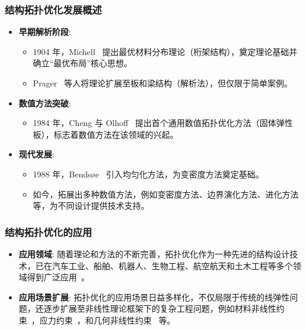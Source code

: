 \documentclass{beamer}  %
\numberwithin{subsection}{section}             %
\begin{document}
\begin{frame}
\frametitle{结构拓扑优化发展概述}
\small{
\begin{itemize}
	\item \textbf{早期解析阶段}:
	\begin{itemize}
		\item 1904 年，Michell~\cite{michell1904lviii} 提出最优材料分布理论（桁架结构），奠定理论基础并确立“最优布局”核心思想。
		
		\item Prager~\cite{prager1977optimization, rozvany1972optimal} 等人将理论扩展至板和梁结构（解析法），但仅限于简单案例。
	\end{itemize}
\end{itemize}

\begin{itemize}
	\item \textbf{数值方法突破}:
	\begin{itemize}
		\item 1984 年，Cheng 与 Olhoff~\cite{cheng1981investigation} 提出首个通用数值拓扑优化方法（固体弹性板），标志着数值方法在该领域的兴起。
	\end{itemize}
\end{itemize}

\begin{itemize}
	\item \textbf{现代发展}:
	\begin{itemize}
		\item 1988 年，Bendsøe~\cite{bendsoe1988generating} 引入均匀化方法，为变密度方法奠定基础。
		
		\item 如今，拓展出多种数值方法，例如变密度方法、边界演化方法、进化方法等，为不同设计提供技术支持。
	\end{itemize}
\end{itemize}
}
\end{frame}

\begin{frame}
\frametitle{结构拓扑优化的应用}
\small{
\begin{itemize}
	\item \textbf{应用领域}: 随着理论和方法的不断完善，拓扑优化作为一种先进的结构设计技术，已在汽车工业、船舶、机器人、生物工程、航空航天和土木工程等多个领域得到广泛应用~\cite{jihong2021review, zhu2016topology, xiao2020design, koper2021topology, mallek2024topological, park2019topology}。
\end{itemize}

\begin{itemize}
	\item \textbf{应用场景扩展}: 拓扑优化的应用场景日益多样化，不仅局限于传统的线弹性问题，还逐步扩展至非线性理论框架下的复杂工程问题，例如材料非线性约束~\cite{wang2023improved}，应力约束~\cite{han2021topology}，和几何非线性约束~\cite{zhang2020topology,zhu2020design} 等。
\end{itemize}
}
\end{frame}
\end{document}
